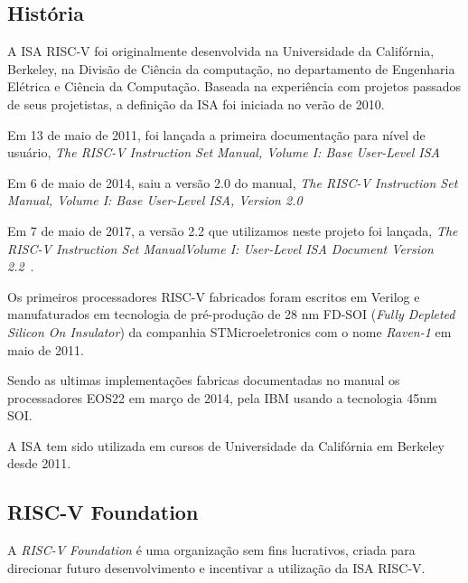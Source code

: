 	\subsection{História}%
		A ISA RISC-V foi originalmente desenvolvida na Universidade da Califórnia, Berkeley, na Divisão de Ciência da computação, no departamento de Engenharia Elétrica e Ciência da Computação. Baseada na experiência com projetos passados de seus projetistas, a definição da ISA foi iniciada no verão de 2010.\

		Em 13 de maio de 2011, foi lançada a primeira documentação para nível de usuário, \textit{The RISC-V Instruction Set Manual, Volume I: Base User-Level ISA} ~\cite{riscv_manual_v1}

		Em 6 de maio de 2014, saiu a versão 2.0 do manual, \textit{The RISC-V Instruction Set Manual, Volume I: Base User-Level ISA, Version 2.0} ~\cite{riscv_manual_v2}

		Em 7 de maio de 2017, a versão 2.2 que utilizamos neste projeto foi lançada, \textit{The RISC-V Instruction Set ManualVolume I: User-Level ISA Document Version 2.2}~\cite{riscv_spec}.

		Os primeiros processadores RISC-V fabricados foram escritos em Verilog e manufaturados em tecnologia de pré-produção de 28 nm FD-SOI (\textit{Fully Depleted Silicon On Insulator}) da companhia STMicroeletronics com o nome \textit{Raven-1} em maio de 2011.

		Sendo as ultimas implementações fabricas documentadas no manual os processadores EOS22 em março de 2014, pela IBM usando a tecnologia 45nm SOI.

		A ISA tem sido utilizada em cursos de Universidade da Califórnia em Berkeley desde 2011.


	

	\subsection{RISC-V Foundation}
		
		A \textit{RISC-V Foundation} é uma organização sem fins lucrativos, criada para direcionar futuro desenvolvimento e incentivar a utilização da ISA RISC-V.\ ~\cite{riscv_foundation} 

